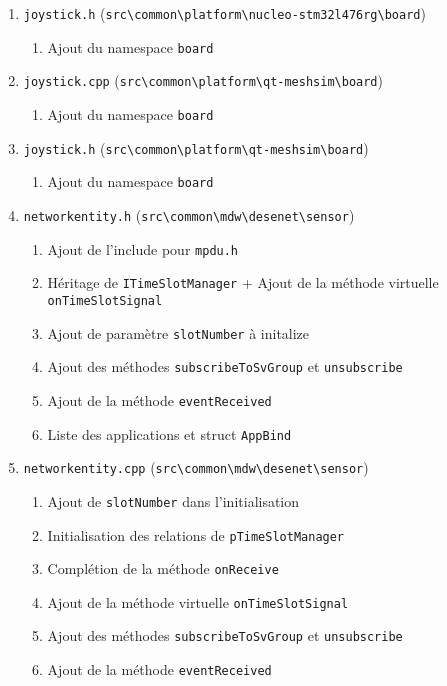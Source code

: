 \begin{enumerate}
\begin{enumerate}
\end{enumerate}
\item \verb!joystick.h! (\verb!src\common\platform\nucleo-stm32l476rg\board!)
\begin{enumerate}
  \item Ajout du namespace \verb!board!
\end{enumerate}
\item \verb!joystick.cpp! (\verb!src\common\platform\qt-meshsim\board!)
\begin{enumerate}
  \item Ajout du namespace \verb!board!
\end{enumerate}
\item \verb!joystick.h! (\verb!src\common\platform\qt-meshsim\board!)
\begin{enumerate}
  \item Ajout du namespace \verb!board!
\end{enumerate}
\item \verb!networkentity.h! (\verb!src\common\mdw\desenet\sensor!)
\begin{enumerate}
  \item Ajout de l'include pour \verb!mpdu.h!
  \item Héritage de \verb!ITimeSlotManager! + Ajout de la méthode virtuelle \verb!onTimeSlotSignal!
  \item Ajout de paramètre \verb!slotNumber! à initalize
  \item Ajout des méthodes \verb!subscribeToSvGroup! et \verb!unsubscribe!
  \item Ajout de la méthode \verb!eventReceived!
  \item Liste des applications et struct \verb!AppBind!
\end{enumerate}
\item \verb!networkentity.cpp! (\verb!src\common\mdw\desenet\sensor!)
\begin{enumerate}
  \item Ajout de \verb!slotNumber! dans l'initialisation
  \item Initialisation des relations de \verb!pTimeSlotManager!
  \item Complétion de la méthode \verb!onReceive!
  \item Ajout de la méthode virtuelle \verb!onTimeSlotSignal!
  \item Ajout des méthodes \verb!subscribeToSvGroup! et \verb!unsubscribe!
  \item Ajout de la méthode \verb!eventReceived!
\end{enumerate}
\end{enumerate}
